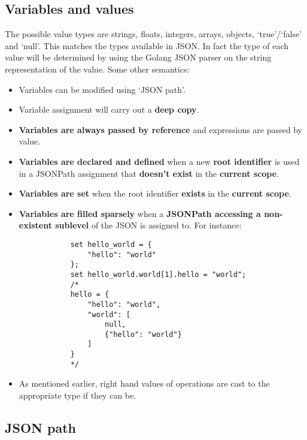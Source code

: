 \documentclass[12pt, letterpaper]{article}
\begin{document}
\subsection{Variables and values}

The possible value types are strings, floats, integers, arrays, objects, `true'/`false' and `null'. This matches the types available in JSON. In fact the type of each value will be determined by using the Golang JSON parser on the string representation of the value. Some other semantics:

\begin{center}
    \begin{itemize} 
        \item Variables can be modified using `JSON path'.
        \item Variable assignment will carry out a \textbf{deep copy}.
        \item \textbf{Variables are always passed by reference} and expressions are passed by value.
        \item \textbf{Variables are declared and defined} when a new \textbf{root identifier} is used in a JSONPath assignment that \textbf{doesn't exist} in the \textbf{current scope}.
        \item \textbf{Variables are set} when the root identifier \textbf{exists} in the \textbf{current scope}.
        \item \textbf{Variables are filled sparsely} when a \textbf{JSONPath accessing a non-existent sublevel} of the JSON is assigned to. For instance:
        \begin{verbatim}
            set hello_world = {
                "hello": "world"
            };
            set hello_world.world[1].hello = "world";
            /*
            hello = {
                "hello": "world",
                "world": [
                    null,
                    {"hello": "world"}
                ]
            }
            */
        \end{verbatim}
        \item As mentioned earlier, right hand values of operations are cast to the appropriate type if they can be. 
    \end{itemize}
\end{center}

\subsection{JSON path}
\end{document}
